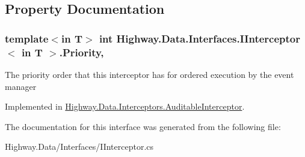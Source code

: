 \subsection{Property Documentation}
\hypertarget{interface_highway_1_1_data_1_1_interfaces_1_1_i_interceptor-g_a7d04e39fcc9ecb1139044cbdda2df23a}{
\subsubsection[{Priority}]{\setlength{\rightskip}{0pt plus 5cm}template$<$in T$>$ int {\bf Highway.\-Data.\-Interfaces.\-I\-Interceptor}$<$ in T $>$.Priority\hspace{0.3cm}{\ttfamily [get]}, {\ttfamily [set]}}}\label{interface_highway_1_1_data_1_1_interfaces_1_1_i_interceptor-g_a7d04e39fcc9ecb1139044cbdda2df23a}


The priority order that this interceptor has for ordered execution by the event manager 



Implemented in \hyperlink{class_highway_1_1_data_1_1_interceptors_1_1_auditable_interceptor_a58ec8c5deb639bea285d6d288a4838c3}{Highway.\-Data.\-Interceptors.\-Auditable\-Interceptor}.



The documentation for this interface was generated from the following file\-:\begin{DoxyCompactItemize}
\item 
Highway.\-Data/\-Interfaces/I\-Interceptor.\-cs\end{DoxyCompactItemize}
